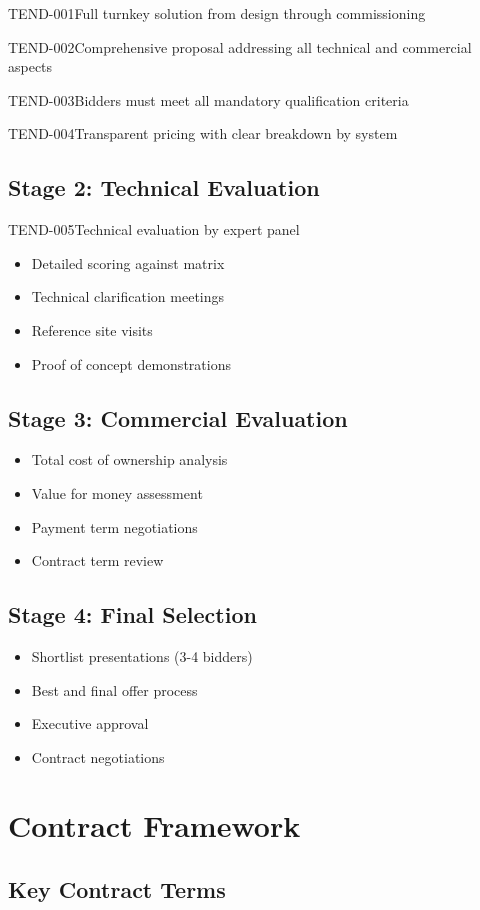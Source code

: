 \begin{requirement}{TEND-001}{Full turnkey solution from design through commissioning}
\begin{requirement}{TEND-002}{Comprehensive proposal addressing all technical and commercial aspects}
\begin{requirement}{TEND-003}{Bidders must meet all mandatory qualification criteria}
\begin{requirement}{TEND-004}{Transparent pricing with clear breakdown by system}
\subsection{Stage 2: Technical Evaluation}

\begin{requirement}{TEND-005}{Technical evaluation by expert panel}

\begin{itemize}
    \item Detailed scoring against matrix
    \item Technical clarification meetings
    \item Reference site visits
    \item Proof of concept demonstrations
\end{itemize}

\subsection{Stage 3: Commercial Evaluation}

\begin{itemize}
    \item Total cost of ownership analysis
    \item Value for money assessment
    \item Payment term negotiations
    \item Contract term review
\end{itemize}

\subsection{Stage 4: Final Selection}

\begin{itemize}
    \item Shortlist presentations (3-4 bidders)
    \item Best and final offer process
    \item Executive approval
    \item Contract negotiations
\end{itemize}

\section{Contract Framework}

\subsection{Key Contract Terms}


\end{requirement}
\end{requirement}
\end{requirement}
\end{requirement}
\end{requirement}
